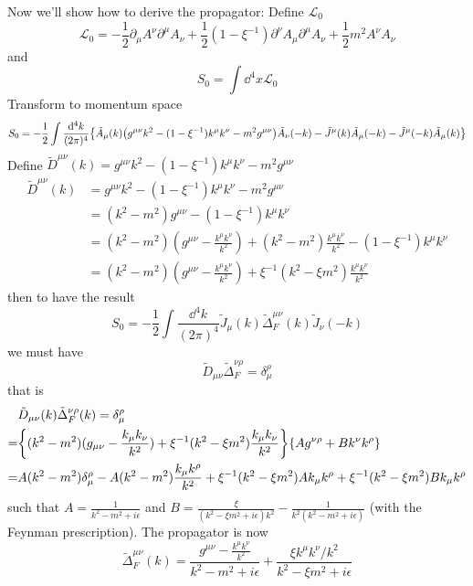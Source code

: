 \documentclass{article}
\newcommand{\lag}{\mathcal{L}}
\newcommand{\sm}{^{\mu}}
\newcommand{\sn}{^{\nu}}
\newcommand{\smn}{^{\mu\nu}}
\begin{document}
\begin{enumerate}[\bf 1.]
  Now we'll show how to derive the propagator: Define $\lag_0$
  $$\lag_0=-\frac{1}{2}\partial_{\mu}A^{\nu}\partial^{\mu}A_{\nu}+\frac{1}{2}(1-\xi^{-1})\partial^{\nu}A_{\mu}\partial^{\mu}A_{\nu}+\frac{1}{2}m^2A^{\nu}A_{\nu}$$
  and $$S_0=\int \dd^4x \lag_0$$
  Transform to momentum space
  $$S_0=-\frac{1}{2}\int\frac{\dd^4 k}{(2\pi)^4}\Bqty{\tilde A_{\mu}(k)\pqty{g^{\mu\nu}k^2-(1-\xi^{-1})k^{\mu}k^{\nu}-m^2g^{\mu\nu}}\tilde A_{\nu}(-k)-\tilde J^{\mu}(k)\tilde A_{\mu}(-k)-\tilde J^{\mu}(-k)\tilde A_{\mu}(k)}$$
  Define $\tilde D^{\mu\nu}(k)=g^{\mu\nu}k^2-(1-\xi^{-1})k^{\mu}k^{\nu}-m^2g^{\mu\nu}$
  \begin{align*}
    \tilde D^{\mu\nu}(k)&=g^{\mu\nu}k^2-(1-\xi^{-1})k^{\mu}k^{\nu}-m^2g^{\mu\nu}\\
    &=(k^2-m^2)g^{\mu\nu}-(1-\xi^{-1})k^{\mu}k^{\nu}\\
    &=(k^2-m^2)(g^{\mu\nu}-\frac{k^{\mu}k^{\nu}}{k^2})+(k^2-m^2)\frac{k^{\mu}k^{\nu}}{k^2}-(1-\xi^{-1})k\sm k\sn\\
    &=(k^2-m^2)(g^{\mu\nu}-\frac{k^{\mu}k^{\nu}}{k^2})+\xi^{-1}(k^2-\xi m^2)\frac{k\sm k\sn}{k^2}
  \end{align*}
  then to have the result
  $$S_0=-\frac{1}{2}\int\frac{\dd^4k}{(2\pi)^4}\tilde J_{\mu}(k)\tilde \Delta_F^{\mu\nu}(k)\tilde J_{\nu}(-k)$$
  we must have
  $$\tilde D_{\mu\nu}\tilde \Delta_F^{\nu\rho}=\delta_{\mu}^{\rho}$$
  that is
  \begin{align*}
    &\tilde D_{\mu\nu}(k)\tilde \Delta_F^{\nu\rho}(k)=\delta_{\mu}^{\rho}\\
    =&\Bqty{(k^2-m^2)(g_{\mu\nu}-\frac{k_{\mu}k_{\nu}}{k^2})+\xi^{-1}(k^2-\xi m^2)\frac{k_{\mu} k_{\nu}}{k^2}}\Bqty{Ag^{\nu\rho}+Bk^{\nu}k^{\rho}}\\
    =&A(k^2-m^2)\delta^{\rho}_{\mu}-A(k^2-m^2)\frac{k_{\mu}k^{\rho}}{k^2}+\xi^{-1}(k^2-\xi m^2)Ak_{\mu}k^{\rho}+\xi^{-1}(k^2-\xi m^2)Bk_{\mu}k^{\rho}
  \end{align*}
  such that $A=\frac{1}{k^2-m^2+i\epsilon}$ and $B=\frac{\xi}{(k^2-\xi m^2+i\epsilon)k^2}-\frac{1}{k^2(k^2-m^2+i\epsilon)}$ (with the Feynman prescription). The propagator is now
  $$\tilde \Delta_F^{\mu\nu}(k)=\frac{g\smn-\frac{k\sm k\sn}{k^2}}{k^2-m^2+i\epsilon}+\frac{\xi k\sm k\sn/k^2}{k^2-\xi m^2+i\epsilon}$$


\end{enumerate}
\end{document}
